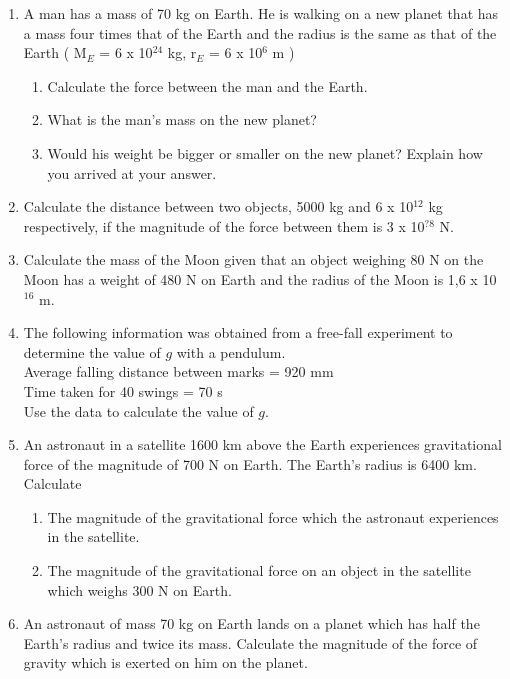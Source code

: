 \begin{eocexercises}{}
\begin{enumerate}
\item {A man has a mass of 70 kg on Earth. He is walking on a new planet that has a mass four times that of the Earth and the radius is the same as that of the Earth ( M$_E$ = 6 x 10$^{24}$ kg, r$_E$ = 6 x 10$^6$ m )
\begin{enumerate}
\item Calculate the force between the man and the Earth.
\item What is the man's mass on the new planet?
\item Would his weight be bigger or smaller on the new planet? Explain how you arrived at your answer.
\end{enumerate}
}

\item {Calculate the distance between two objects, 5000 kg and 6 x 10$^{12}$ kg respectively, if the magnitude of the force between them is 3 x 10$^{?8}$ N.	}

\item {Calculate the mass of the Moon given that an object weighing 80 N on the Moon has a weight of 480 N on Earth and the radius of the Moon is 1,6 x 10$^{16}$ m.}

\item {The following information was obtained from a free-fall experiment to determine the value of $g$ with a pendulum.\\
Average falling distance between marks = 920 mm\\
Time taken for 40 swings = 70 s\\
Use the data to calculate the value of $g$.}	%

\item {An astronaut in a satellite 1600 km above the Earth experiences gravitational force of the magnitude of 700 N on Earth.  The Earth's radius is 6400 km.  Calculate
\begin{enumerate}
\item The magnitude of the gravitational force which the astronaut experiences in the satellite.
\item The magnitude of the gravitational force on an object in the satellite which weighs 300 N on Earth.
\end{enumerate}}

\item {An astronaut of mass 70 kg on Earth lands on a planet which has half the Earth's radius and twice its mass.  Calculate the magnitude of the force of gravity which is exerted on him on the planet.}


\end{enumerate}
\end{eocexercises}
